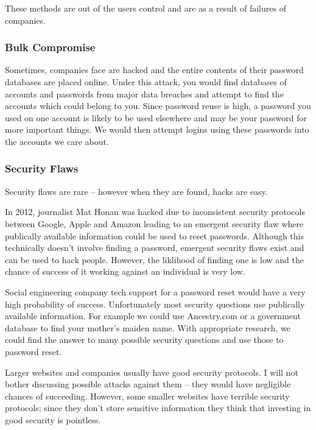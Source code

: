 \documentclass[10pt,\jkfside,a4paper]{article}
\begin{document}
\begin{enumerate}
These methods are out of the users control and are as a result of failures of companies.

\subsubsection*{Bulk Compromise}

Sometimes, companies face are hacked and the entire contents of their password databases are 
placed online. Under this attack, you would find databases of accounts and passwords from 
major data breaches and attempt to find the accounts which could belong to you. Since password 
reuse is high, a password you used on one account is likely to be used elsewhere and may be 
your password for more important things. We would then attempt logins using these passwords 
into the accounts we care about.

\subsubsection*{Security Flaws}

Security flaws are rare -- however when they are found, hacks are easy.

In 2012, journalist Mat Honan was hacked due to inconsistent security protocols between Google, Apple 
and Amazon leading to an emergent security flaw where publically available information could be used 
to reset passwords. Although this technically doesn't involve finding a password, emergent security 
flaws exist and can be used to hack people. However, the liklihood of finding one is low and the chance 
of success of it working against an individual is very low.

Social engineering company tech support for a password reset would have a very high probability of 
success. Unfortunately most security questions use publically available information. For example 
we could use Ancestry.com or a government database to find your mother's maiden name. With appropriate 
research, we could find the answer to many possible security questions and use those to password reset.

Larger websites and companies usually have good security protocols. I will not bother discussing possible 
attacks against them -- they would have negligible chances of succeeding. However, some smaller websites 
have terrible security protocols; since they don't store sensitive information they think that investing 
in good security is pointless. 


\end{enumerate}
\end{document}
